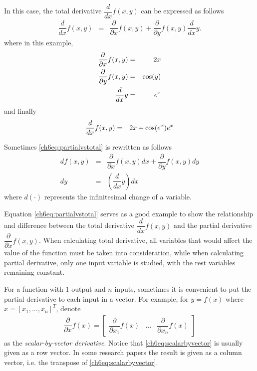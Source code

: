 In this case, the total derivative $\dfrac{d}{dx}f(x, y)$ can be expressed as follows
\begin{eqnarray}
	\dfrac{d}{dx}f(x, y) &=& \dfrac{\partial}{\partial x} f(x, y) + \dfrac{\partial}{\partial y}f(x, y) \dfrac{d}{dx}y. \label{ch6eq:partialvstotal}
\end{eqnarray}
where in this example,
\begin{eqnarray}
	\dfrac{\partial}{\partial x} f(x, y) &=& 2x \nonumber \\
	\dfrac{\partial}{\partial y} f(x, y) &=& \textup{cos}(y) \nonumber \\
	\dfrac{d}{dx}y &=& e^x \nonumber
\end{eqnarray}
and finally
\begin{eqnarray}
	\dfrac{d}{dx}f(x, y) &=& 2x + \textup{cos}(e^x)e^x \nonumber
\end{eqnarray}

Sometimes \eqref{ch6eq:partialvstotal} is rewritten as follows
\begin{eqnarray}
	df(x, y) &=& \dfrac{\partial}{\partial x} f(x, y) dx + \dfrac{\partial}{\partial y}f(x, y) dy \nonumber \\
	dy &=& \left(\dfrac{d}{dx}y\right) dx \nonumber
\end{eqnarray}
where $d(\cdot)$ represents the infinitesimal change of a variable.

Equation \eqref{ch6eq:partialvstotal} serves as a good example to show the relationship and difference between the total derivative $\dfrac{d}{dx}f(x, y)$ and the partial derivative $\dfrac{\partial}{\partial x} f(x, y)$. When calculating total derivative, all variables that would affect the value of the function must be taken into consideration, while when calculating partial derivative, only one input variable is studied, with the rest variables remaining constant.

For a function with $1$ output and $n$ inputs, sometimes it is convenient to put the partial derivative to each input in a vector. For example, for $y=f(x)$ where $x = \left[x_1,...,x_n\right]^T$, denote
\begin{eqnarray}
	\dfrac{\partial}{\partial x}f(x) = \left[\begin{array}{ccc}
	\dfrac{\partial}{\partial x_1}f(x) &
	\ldots &
	\dfrac{\partial}{\partial x_n}f(x)
	\end{array}\right] \label{ch6eq:scalarbyvector}
\end{eqnarray}
as the \textit{scalar-by-vector derivative}. Notice that \eqref{ch6eq:scalarbyvector} is usually given as a row vector. In some research papers the result is given as a column vector, i.e. the transpose of \eqref{ch6eq:scalarbyvector}.

